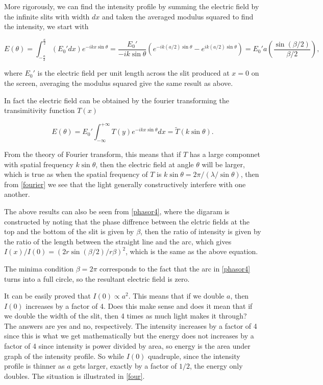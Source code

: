 \documentclass[english,a4paper,12pt]{report}
\begin{document}
More rigorously, we can find the intensity profile by summing the electric field by the infinite slits with width \(dx\) and taken the averaged modulus squared to find the intensity, we start with 

\begin{equation}
    E(\theta ) = \int_{-\frac{a}{2} }^{\frac{a}{2} } (E_0 ' dx ) e^{-ikx\sin \theta } = \frac{E_0 '}{-ik\sin \theta }\left( e^{-ik(a /2)\sin \theta }- e^{ik(a /2)\sin \theta }   \right) = E_0 'a \left( \frac{\sin \left( \beta /2 \right)}{\beta /2 }  \right), 
\end{equation}

where \(E_0 '\) is the electric field per unit length across the slit produced at \(x=0\) on the screen, averaging the modulus squared give the same result as above.

In fact the electric field can be obtained by the fourier transforming the transimitivity function \(T(x)\)

\begin{equation}
    E(\theta) = E_0 ' \int_{-\infty}^{+\infty} T(y)e^{-ikx\sin \theta }dx = \tilde{T}(k\sin \theta ).   
\end{equation}

From the theory of Fourier transform, this means that if \(T\) has a large componnet with spatial frequency \(k\sin \theta \), then the electric field at angle \(\theta \) will be larger, which is true as when the spatial frequency of \(T\) is \(k\sin \theta = 2\pi /(\lambda /\sin \theta )\), then from \cref{fourier} we see that the light generally constructively interfere with one another.   

The above results can also be seen from \cref{phasor4}, where the digaram is constructed by noting that the phase diffrence between the elctric fields at the top and the bottom of the slit is given by \(\beta \), then the ratio of intensity is given by the ratio of the length between the straight line and the arc, which gives \(I(x) / I(0) = (2r \sin (\beta /2) /r \beta )^2\), which is the same as the above equation.  

The minima condition \(\beta = 2\pi \) corresponds to the fact that the arc in \cref{phasor4} turns into a full circle, so the resultant electric field is zero. 


{It can be easily proved that \(I(0) \propto a^2\). This means that if we double \(a\), then \(I(0)\) increases by a factor of 4. Does this make sense and does it mean that if we double the width of the slit, then 4 times as much light makes it through?}
{The answers are yes and no, respectively. The intensity increases by a factor of 4 since this is what we get mathematically but the energy does not increases by a factor of 4 since intensity is power divided by area, so energy is the area under graph of the intensity profile. So while \(I(0)\) quadruple, since the intensity profile is thinner as \(a\) gets larger, exactly by a factor of \(1/2\), the energy only doubles. The situation is illustrated in \cref{four}.}
\end{document}
